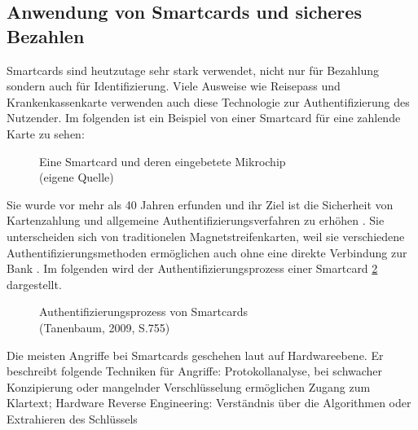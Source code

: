 \subsection{Anwendung von Smartcards und sicheres Bezahlen}
Smartcards sind heutzutage sehr stark verwendet, nicht nur für Bezahlung sondern auch für Identifizierung.
Viele Ausweise wie Reisepass und Krankenkassenkarte verwenden auch diese Technologie zur Authentifizierung
des Nutzender. Im folgenden ist ein Beispiel von einer Smartcard für eine zahlende Karte zu sehen: 

\begin{figure}[H]
   \caption{Eine Smartcard und deren eingebetete Mikrochip\\(eigene Quelle)}
   \label{fig:eigenes_Bild}
\end{figure}

Sie wurde vor mehr als 40 Jahren erfunden und ihr Ziel ist die Sicherheit von Kartenzahlung und allgemeine
Authentifizierungsverfahren zu erhöhen \cite{refip:JFSB}. Sie unterscheiden sich von traditionelen 
Magnetstreifenkarten, weil sie verschiedene Authentifizierungsmethoden ermöglichen auch ohne eine direkte 
Verbindung zur Bank \cite{refbook:ATMS}. Im folgenden wird der Authentifizierungsprozess einer Smartcard 
\ref{fig:refbook_ATMS} dargestellt. 

\vfill
\begin{figure}[H]
   \caption{Authentifizierungsprozess von Smartcards\\(Tanenbaum, 2009, S.755)}
   \label{fig:refbook_ATMS}
\end{figure}
\vfill

Die meisten Angriffe bei Smartcards geschehen laut \cite{refmas:ASSS} auf Hardwareebene. Er beschreibt folgende 
Techniken für Angriffe: Protokollanalyse, bei schwacher Konzipierung oder mangelnder Verschlüsselung ermöglichen Zugang 
zum Klartext; Hardware Reverse Engineering: Verständnis über die Algorithmen oder Extrahieren des Schlüssels


